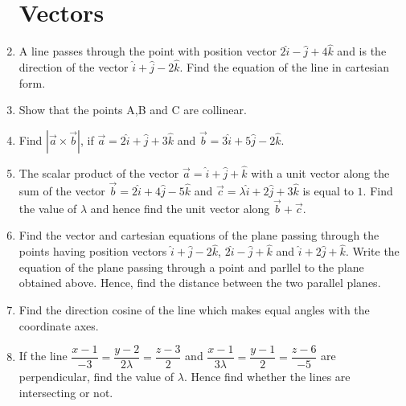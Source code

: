 \begin{enumerate}
\section*{Vectors}

\item A line passes through the point with position vector 
$2\hat{i} - \hat{j} + 4\hat{k} $ and is the direction of the vector 
$\hat{i} + \hat{j} - 2\hat{k} $. 
Find the equation of the line in cartesian form.

\item Show that the points 
A,B
and C are collinear.

\item Find
$|\overrightarrow{a} \times \overrightarrow{b}|$,
if $\overrightarrow{a}=2\hat{i}+\hat{j}+3\hat{k}$ and
$\overrightarrow{b}=3\hat{i}+5\hat{j}-2\hat{k}$.   

\item The scalar product of the vector 
$\overrightarrow{a} = \hat{i} + \hat{j} + \hat{k}$
with a unit vector along the sum of the vector 
$\overrightarrow{b} = 2\hat{i} + 4\hat{j} - 5\hat{k}$ and
$\overrightarrow{c} = \lambda \hat{i} + 2\hat{j} + 3\hat{k}$ 
is equal to $1$. Find the value of $\lambda$ and hence find 
the unit vector along 
$\overrightarrow{b} + \overrightarrow{c}$.

\item Find the vector and cartesian equations of the plane
passing through the points having position vectors 
$\hat{i} + \hat{ j} - 2\hat{k}$, $2\hat{i}-\hat{j} + \hat{k}$ 
and $\hat{i} + 2\hat{j} + \hat{k}$. Write the equation of the 
plane passing through a point  and parllel to 
the plane obtained above. Hence, find the distance between the 
two parallel planes.

\item Find the direction cosine of the line which makes 
equal angles with the coordinate axes. 

\item If the line 
$\dfrac{x-1}{-3} = \dfrac{y-2}{2\lambda} = \dfrac{z-3}{2} $ and 
$\dfrac{x-1}{3\lambda} = \dfrac{y-1}{2}  = \dfrac{z-6}{-5}$ 
are perpendicular, find the value of $\lambda$. 
Hence find whether the lines are intersecting or not.
\end{enumerate}